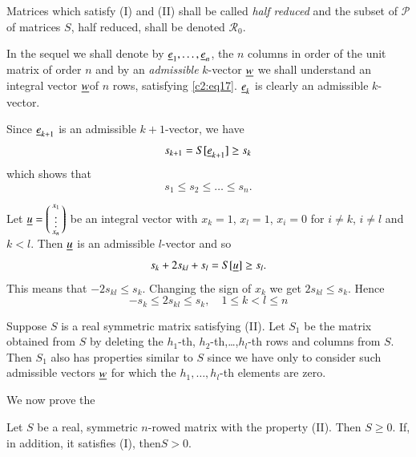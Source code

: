 Matrices which satisfy (I) and (II) shall be called {\em half reduced}
and the subset of $\mathscr{P}$ of matrices $S$, half reduced, shall
be denoted $\mathscr{R}_{0}$.

In the sequel we shall denote by $\underline{e}_{1},\ldots,\underline{e}_{n}$, the
$n$ columns in order of the unit matrix of order $n$ and by an {\em
  admissible} $k$-vector $\underline{w}$ we shall understand an integral
vector $\underline{w}$\pageoriginale of $n$ rows, satisfying
\eqref{c2:eq17}. $\underline{e}_{k}$ is clearly an admissible $k$-vector.

Since $\underline{e}_{k+1}$ is an admissible $k+1$-vector, we have
$$
s_{k+1}=S[\underline{e}_{k+1}]\geq s_{k}
$$
which shows that
\begin{equation*}
s_{1}\leq s_{2}\leq \ldots\leq s_{n}.\tag{18}\label{c2:eq18}
\end{equation*}

Let $\underline{u}=\left(\begin{smallmatrix} x_{1}\\ \vdots\\ x_{n}
\end{smallmatrix}\right)$ be an integral vector with $x_{k}=1$,
$x_{l}=1$, $x_{i}=0$ for $i\neq k$, $i\neq l$ and $k<l$. Then $\underline{u}$
is an admissible $l$-vector and so
$$
s_{k}+2s_{kl}+s_{l}=S[\underline{u}]\geq s_{l}.
$$
This means that $-2s_{kl}\leq s_{k}$. Changing the sign of $x_{k}$ we
get $2s_{kl}\leq s_{k}$. Hence
\begin{equation*}
-s_{k}\leq 2s_{kl}\leq s_{k},\quad 1\leq k<l\leq n\tag{19}\label{c2:eq19}
\end{equation*}

\begin{remark*}
Suppose $S$ is a real symmetric matrix satisfying (II). Let $S_{1}$ be
the matrix obtained from $S$ by deleting the $h_{1}$-th,
$h_{2}$-th,\ldots,$h_{l}$-th rows and columns from $S$. Then $S_{1}$
also has properties similar to $S$ since we have only to consider such
admissible vectors $\underline{w}$ for which the $h_{1},\ldots,h_{l}$-th
elements are zero.
\end{remark*}

We now prove the
\begin{thm}\label{chap2:thm3}
Let $S$ be a real, symmetric $n$-rowed matrix with the property
{\rm(II)}. Then $S\geq 0$. If, in addition, it satisfies {\rm(I)},
then\pageoriginale $S>0$.
\end{thm}

